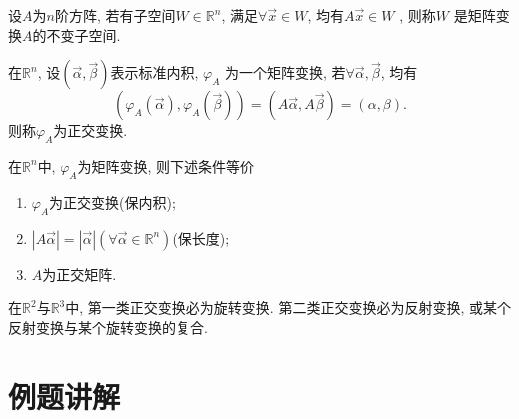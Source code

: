\begin{Def}
设$A$为$n$阶方阵, 若有子空间$W\in\mathbb{R}^n$, 满足$\forall \vec{x}\in W$, 均有$A\vec{x}\in W$ , 则称$W$ 是矩阵变换$A$的不变子空间.
\end{Def}

\begin{Def}
在$\mathbb{R}^n$, 设$(\vec{\alpha},\vec{\beta})$表示标准内积, $\varphi_A$ 为一个矩阵变换, 若$\forall \vec{\alpha},\vec{\beta}$, 均有
$$(\varphi_A(\vec{\alpha}),\varphi_A(\vec{\beta}))=(A\vec{\alpha}  ,A\vec{\beta})=(\alpha,\beta).$$
则称$\varphi_A$为正交变换.
\end{Def}

\begin{thm}
在$\mathbb{R}^n$中, $\varphi_A$为矩阵变换, 则下述条件等价
\begin{enumerate}
\item $\varphi_A$为正交变换(保内积);
\item $|A\vec{\alpha}|=|\vec{\alpha}|(\forall \vec{\alpha}\in \mathbb{R}^n)$(保长度);
\item $A$为正交矩阵.
\end{enumerate}
\end{thm}

\begin{thm}
在$\mathbb{R}^2$与$\mathbb{R}^3$中, 第一类正交变换必为旋转变换. 第二类正交变换必为反射变换, 或某个反射变换与某个旋转变换的复合.
\end{thm}


\section{例题讲解}

